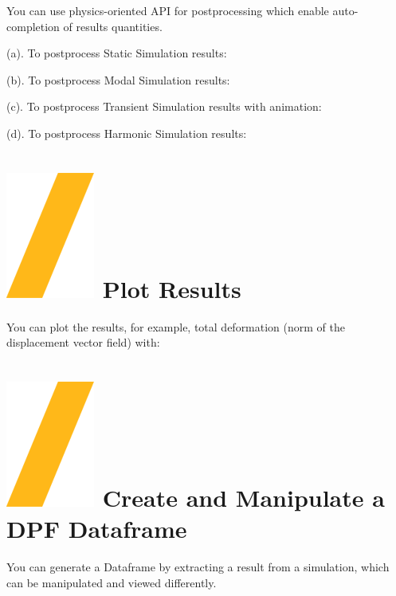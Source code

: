 \documentclass[9pt,landscape]{article}
\begin{document}
\begin{multicols}{3}
You can use physics-oriented API for postprocessing which enable auto-completion of results quantities.

\vspace{2mm} %

(a). To postprocess Static Simulation results:


(b). To postprocess Modal Simulation results:


(c). To postprocess Transient Simulation results with animation:


(d). To postprocess Harmonic Simulation results:


\section{\includegraphics[height=\fontcharht\font`\S]{slash.png} Plot Results}

You can plot the results, for example, total deformation (norm of the displacement vector field) with: 



\section{\includegraphics[height=\fontcharht\font`\S]{slash.png} Create and Manipulate a DPF Dataframe}
You can generate a Dataframe by extracting a result from a simulation, which can be manipulated and viewed differently.


\end{multicols}
\end{document}
